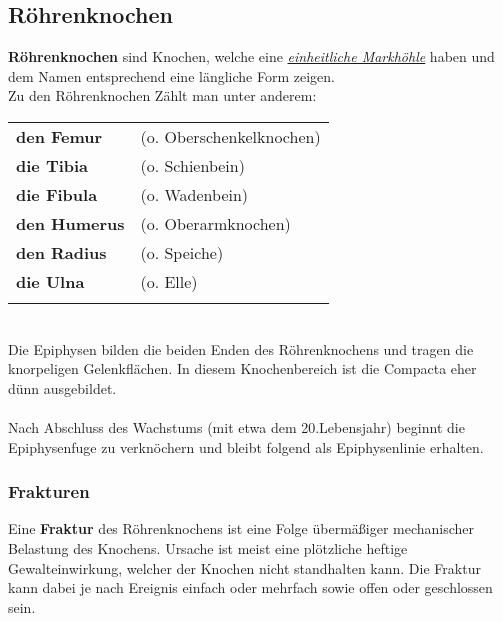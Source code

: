\documentclass{article}
\begin{document}
\subsection{Röhrenknochen}
\textbf{Röhrenknochen} sind Knochen, welche eine \underline{\textit{einheitliche Markhöhle}} haben und dem Namen entsprechend eine längliche Form zeigen. \\
Zu den Röhrenknochen Zählt man unter anderem:\\
\begin{tabular}{@{}l l@{}}\\
    \hline
    \textbf{den Femur}   & (o. Oberschenkelknochen) \\
    \textbf{die Tibia}   & (o. Schienbein) \\
    \textbf{die Fibula}  & (o. Wadenbein) \\
    \textbf{den Humerus} & (o. Oberarmknochen) \\
    \textbf{den Radius}  & (o. Speiche) \\
    \textbf{die Ulna}    & (o. Elle) \\
    \hline \\
\end{tabular}
\\
Die Epiphysen bilden die beiden Enden des Röhrenknochens und tragen die knorpeligen Gelenkflächen. In diesem Knochenbereich ist die Compacta eher dünn ausgebildet. \\ \\ 
Nach Abschluss des Wachstums (mit etwa dem 20.Lebensjahr) beginnt die Epiphysenfuge zu verknöchern und bleibt folgend als Epiphysenlinie erhalten.
\subsubsection{Frakturen}
Eine \textbf{Fraktur} des Röhrenknochens ist eine Folge übermäßiger mechanischer Belastung des Knochens.
Ursache ist meist eine plötzliche heftige Gewalteinwirkung, welcher der Knochen nicht standhalten kann. 
Die Fraktur kann dabei je nach Ereignis einfach oder mehrfach sowie offen oder geschlossen sein.


\setlength{\bibhang}{2em} %
\setlength{\bibitemsep}{1em} %
\nocite{*}
\printbibliography[title={Literaturverzeichnis}]
\end{document}

